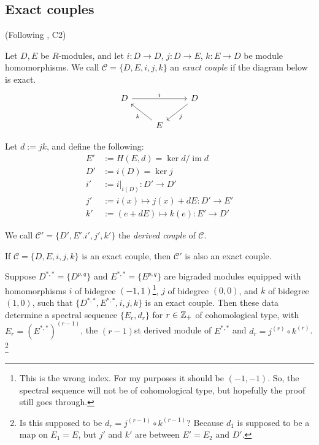 \documentclass{MetricNotes2023}
\def\inte{\ensuremath\mathbb{Z}}
\DeclareMathOperator{\im}{im}
\begin{document}
\subsection{Exact couples}\label{2503301333}

(Following \autocite{spectral_sequences}, C2)

\begin{definition}
Let \(D, E\) be \(R\)-modules, and let \(i : D \to D\), \(j : D\to E\), \(k : E \to D\) be module homomorphisms. We call \(\mathcal{C}=\{D, E, i, j, k\}\) an \textit{exact couple} if the diagram below is exact.
\[\begin{tikzcd}
 D \arrow[rr, "i"] && D \arrow[dl, "j"] \\ 
  & E \arrow[ul, "k"] &  
 \end{tikzcd}\] 
\end{definition}

Let \(d:=jk\), and define the following:
\begin{align*}
E'&:=H(E, d)=\ker d/\im d\\
D'&:=i(D)=\ker j\\
i'&:=i|_{i(D)} : D'\to D'\\
j'&:=i(x)\mapsto j(x)+dE : D'\to E'\\
k'&:=(e+dE)\mapsto k(e) : E' \to D'
\end{align*}

We call \(\mathcal{C}'=\{D', E'. i', j', k'\}\) the \textit{derived couple} of \(\mathcal{C}\). 

\begin{proposition}
If \(\mathcal{C}=\{D, E, i, j, k\}\) is an exact couple, then \(\mathcal{C}'\) is also an exact couple.
\end{proposition}

\begin{theorem}\label{2503301131}
Suppose \(D^{*,*}=\{D^{p,q}\}\) and \(E^{*,*}=\{E^{p,q}\}\) are bigraded modules equipped with homomorphisms \(i\) of bidegree \((-1,1)\)\footnote{This is the wrong index. For my purposes it should be \((-1, -1)\). So, the spectral sequence will not be of cohomological type, but hopefully the proof still goes through.}, \(j\) of bidegree \((0,0)\), and \(k\) of bidegree \((1,0)\), such that \(\{D^{*,*}, E^{*,*}, i, j, k\}\) is an exact couple. Then these data determine a spectral sequence \(\{E_r, d_r\}\) for \(r\in \inte_+\) of cohomological type, with \(E_r=(E^{*,*})^{(r-1)}\), the \((r-1)\)st derived module of \(E^{*,*}\) and \(d_r=j^{(r)}\circ k^{(r)}\). \footnote{Is this supposed to be \(d_r = j^{(r-1)}\circ k^{(r-1)}\)? Because \(d_1\) is supposed to be a map on \(E_1=E\), but \(j'\) and \(k'\) are between \(E'=E_2\) and \(D'\).}
\end{theorem}
\end{document}
